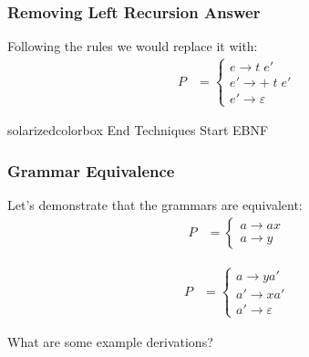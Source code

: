\documentclass[aspectratio=169]{beamer}
\begin{document}
\begin{frame}
\frametitle{Removing Left Recursion Answer}

Following the rules we would replace it with:
\begin{align*}
P &= \begin{cases}e \rightarrow t \; e'\\
  e' \rightarrow + \; t \; e'\\
  e' \rightarrow \varepsilon \text{} \end{cases}
\end{align*}
\end{frame}

\begin{frame}
  \begin{beamercolorbox}[wd=\paperwidth, sep=2em]{solarizedcolorbox}
    { End Techniques \hfill Start
      EBNF}
  \end{beamercolorbox}
\end{frame}

\begin{frame}
\frametitle{Grammar Equivalence}

Let's demonstrate that the grammars are equivalent:
\begin{align*}
P &= \begin{cases}a \rightarrow a x\\
  a \rightarrow y\end{cases}
\end{align*}

\begin{align*}
P &= \begin{cases}a \rightarrow y a'\\
  a' \rightarrow x a'\\
  a' \rightarrow \varepsilon \text{} \end{cases}
\end{align*}

What are some example derivations?
\end{frame}
\end{document}
